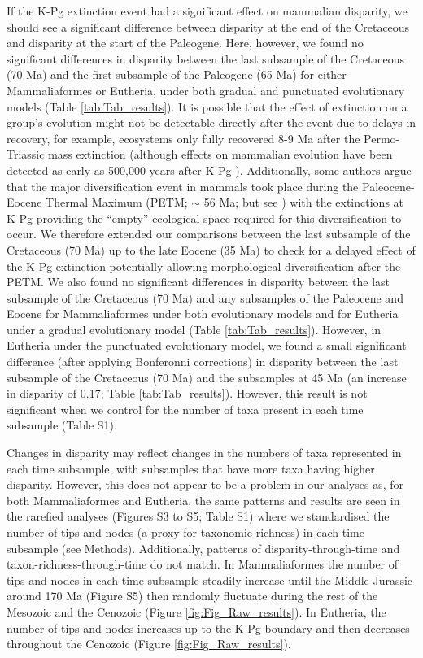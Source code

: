 \documentclass[10pt,letterpaper]{article}
\begin{document}
If the K-Pg extinction event had a significant effect on mammalian disparity, we should see a significant difference between disparity at the end of the Cretaceous and disparity at the start of the Paleogene.
Here, however, we found no significant differences in disparity between the last subsample of the Cretaceous (70 Ma) and the first subsample of the Paleogene (65 Ma) for either Mammaliaformes or Eutheria, under both gradual and punctuated evolutionary models (Table \ref{tab:Tab_results}). 
It is possible that the effect of extinction on a group's evolution might not be detectable directly after the event due to delays in recovery, for example, ecosystems only fully recovered 8-9 Ma after the Permo-Triassic mass extinction \cite{chen2012timing} (although effects on mammalian evolution have been detected as early as 500,000 years after K-Pg \cite{Wilson2013}).
Additionally, some authors argue that the major diversification event in mammals took place during the Paleocene-Eocene Thermal Maximum (PETM; $\sim$ 56 Ma; \cite{bininda2007delayed} but see \cite{meredithimpacts2011,Stadler12042011}) with the extinctions at K-Pg providing the ``empty'' ecological space required for this diversification to occur.
We therefore extended our comparisons between the last subsample of the Cretaceous (70 Ma) up to the late Eocene (35 Ma) to check for a delayed effect of the K-Pg extinction potentially allowing morphological diversification after the PETM. 
We also found no significant differences in disparity between the last subsample of the Cretaceous (70 Ma) and any subsamples of the Paleocene and Eocene for Mammaliaformes under both evolutionary models and for Eutheria under a gradual evolutionary model (Table \ref{tab:Tab_results}).
However, in Eutheria under the punctuated evolutionary model, we found a small significant difference (after applying Bonferonni corrections) in disparity between the last subsample of the Cretaceous (70 Ma) and the subsamples at 45 Ma (an increase in disparity of 0.17; Table \ref{tab:Tab_results}).
However, this result is not significant when we control for the number of taxa present in each time subsample (Table S1). 

Changes in disparity may reflect changes in the numbers of taxa represented in each time subsample, with subsamples that have more taxa having higher disparity. 
However, this does not appear to be a problem in our analyses as, for both Mammaliaformes and Eutheria, the same patterns and results are seen in the rarefied analyses (Figures S3 to S5; Table S1) where we standardised the number of tips and nodes (a proxy for taxonomic richness) in each time subsample (see Methods).
Additionally, patterns of disparity-through-time and taxon-richness-through-time do not match.
In Mammaliaformes the number of tips and nodes in each time subsample steadily increase until the Middle Jurassic around 170 Ma (Figure S5) then randomly fluctuate during the rest of the Mesozoic and the Cenozoic (Figure \ref{fig:Fig_Raw_results}).
In Eutheria, the number of tips and nodes increases up to the K-Pg boundary and then decreases throughout the Cenozoic (Figure \ref{fig:Fig_Raw_results}).
\end{document}
